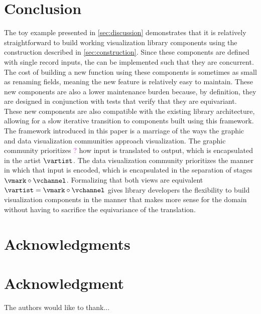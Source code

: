 \documentclass[10pt,journal,compsoc]{IEEEtran}
\newcommand{\note}[1]{\textcolor{magenta}{#1}}
\theoremstyle{definition}
\theoremstyle{remark}
\begin{document}
\section{Conclusion}
The toy example presented in \autoref{sec:discussion} demonstrates that it is relatively straightforward to build working visualization library components using the construction described in \autoref{sec:construction}. Since these components are defined with single record inputs, the can be implemented such that they are concurrent. The cost of building a new function using these components is sometimes as small as renaming fields, meaning the new feature is relatively easy to maintain. These new components are also a lower maintenance burden because, by definition, they are designed in conjunction with tests that verify that they are equivariant.  
These new components are also compatible with the existing library architecture, allowing for a slow iterative transition to components built using this framework. 
The framework introduced in this paper is a marriage of the ways the graphic and data visualization communities approach visualization. The graphic community prioritizes \note{?} how input is translated to output, which is encapsulated in the artist $\vartist$. The data visualization community prioritizes the manner in which that input is encoded, which is encapsulated in the separation of stages $\vmark \circ \vchannel$. Formalizing that both views are equivalent $\vartist=\vmark \circ \vchannel$ gives library developers the flexibility to build visualization components in the manner that makes more sense for the domain without having to sacrifice the equivariance of the translation. 

\appendices



\ifCLASSOPTIONcompsoc
  \section*{Acknowledgments}
\else
  \section*{Acknowledgment}
\fi


The authors would like to thank...


\ifCLASSOPTIONcaptionsoff
  \newpage
\fi
\end{document}
